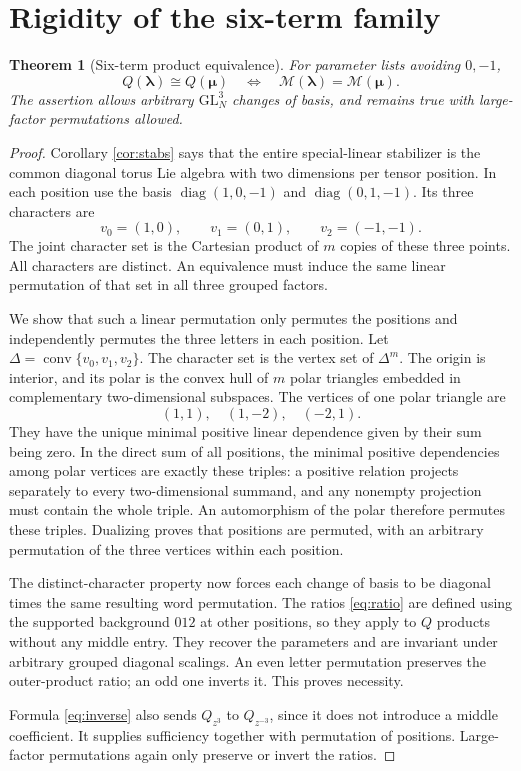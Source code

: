 \documentclass[11pt]{article}
\newtheorem{theorem}{Theorem}[section]
\theoremstyle{remark}\newtheorem{remark}[theorem]{Remark}
\newcommand{\GL}{\mathrm{GL}}
\newcommand{\diag}{\operatorname{diag}}
\newcommand{\mc}{\mathcal M}
\DeclareMathOperator{\conv}{conv}
\begin{document}
\section{Rigidity of the six-term family}\label{sec:Q}
\begin{theorem}[Six-term product equivalence]\label{thm:Q}
For parameter lists avoiding $0,-1$,
\[
 Q(\boldsymbol\lambda)\cong Q(\boldsymbol\mu)
 \quad\Longleftrightarrow\quad
 \mc(\boldsymbol\lambda)=\mc(\boldsymbol\mu).
\]
The assertion allows arbitrary $\GL_N^3$ changes of basis, and remains true with large-factor permutations allowed.
\end{theorem}
\begin{proof}
Corollary \ref{cor:stabs} says that the entire special-linear stabilizer is the common diagonal torus Lie algebra with two dimensions per tensor position. In each position use the basis $\diag(1,0,-1)$ and $\diag(0,1,-1)$. Its three characters are
\[
 v_0=(1,0),\qquad v_1=(0,1),\qquad v_2=(-1,-1).
\]
The joint character set is the Cartesian product of $m$ copies of these three points. All characters are distinct. An equivalence must induce the same linear permutation of that set in all three grouped factors.

We show that such a linear permutation only permutes the positions and independently permutes the three letters in each position. Let $\Delta=\conv\{v_0,v_1,v_2\}$. The character set is the vertex set of $\Delta^m$. The origin is interior, and its polar is the convex hull of $m$ polar triangles embedded in complementary two-dimensional subspaces. The vertices of one polar triangle are
\[
 (1,1),\quad(1,-2),\quad(-2,1).
\]
They have the unique minimal positive linear dependence given by their sum being zero. In the direct sum of all positions, the minimal positive dependencies among polar vertices are exactly these triples: a positive relation projects separately to every two-dimensional summand, and any nonempty projection must contain the whole triple. An automorphism of the polar therefore permutes these triples. Dualizing proves that positions are permuted, with an arbitrary permutation of the three vertices within each position.

The distinct-character property now forces each change of basis to be diagonal times the same resulting word permutation. The ratios \eqref{eq:ratio} are defined using the supported background $012$ at other positions, so they apply to $Q$ products without any middle entry. They recover the parameters and are invariant under arbitrary grouped diagonal scalings. An even letter permutation preserves the outer-product ratio; an odd one inverts it. This proves necessity.

Formula \eqref{eq:inverse} also sends $Q_{z^3}$ to $Q_{z^{-3}}$, since it does not introduce a middle coefficient. It supplies sufficiency together with permutation of positions. Large-factor permutations again only preserve or invert the ratios.
\end{proof}
\end{document}
